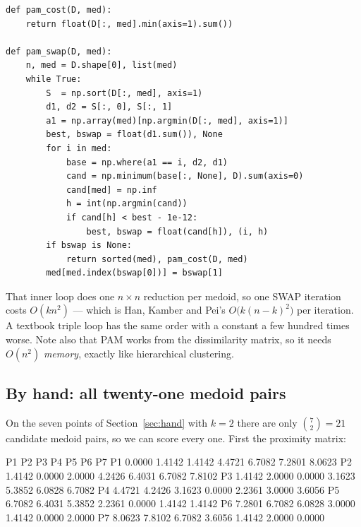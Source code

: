 \documentclass[11pt]{article}
\begin{document}
\begin{lstlisting}
def pam_cost(D, med):
    return float(D[:, med].min(axis=1).sum())

def pam_swap(D, med):
    n, med = D.shape[0], list(med)
    while True:
        S  = np.sort(D[:, med], axis=1)
        d1, d2 = S[:, 0], S[:, 1]
        a1 = np.array(med)[np.argmin(D[:, med], axis=1)]
        best, bswap = float(d1.sum()), None
        for i in med:
            base = np.where(a1 == i, d2, d1)
            cand = np.minimum(base[:, None], D).sum(axis=0)
            cand[med] = np.inf
            h = int(np.argmin(cand))
            if cand[h] < best - 1e-12:
                best, bswap = float(cand[h]), (i, h)
        if bswap is None:
            return sorted(med), pam_cost(D, med)
        med[med.index(bswap[0])] = bswap[1]
\end{lstlisting}

That inner loop does one $n \times n$ reduction per medoid, so one SWAP
iteration costs $O(k n^2)$ --- which is Han, Kamber and Pei's
$O\bigl(k(n-k)^2\bigr)$ per iteration. A textbook triple loop has the same
order with a constant a few hundred times worse. Note also that PAM works
from the dissimilarity matrix, so it needs $O(n^2)$ \emph{memory}, exactly
like hierarchical clustering.

\subsection{By hand: all twenty-one medoid pairs}

On the seven points of Section~\ref{sec:hand} with $k = 2$ there are only
$\binom{7}{2} = 21$ candidate medoid pairs, so we can score every one. First
the proximity matrix:

\begin{codeout}
              P1      P2      P3      P4      P5      P6      P7
  P1      0.0000  1.4142  1.4142  4.4721  6.7082  7.2801  8.0623
  P2      1.4142  0.0000  2.0000  4.2426  6.4031  6.7082  7.8102
  P3      1.4142  2.0000  0.0000  3.1623  5.3852  6.0828  6.7082
  P4      4.4721  4.2426  3.1623  0.0000  2.2361  3.0000  3.6056
  P5      6.7082  6.4031  5.3852  2.2361  0.0000  1.4142  1.4142
  P6      7.2801  6.7082  6.0828  3.0000  1.4142  0.0000  2.0000
  P7      8.0623  7.8102  6.7082  3.6056  1.4142  2.0000  0.0000
\end{codeout}
\end{document}

